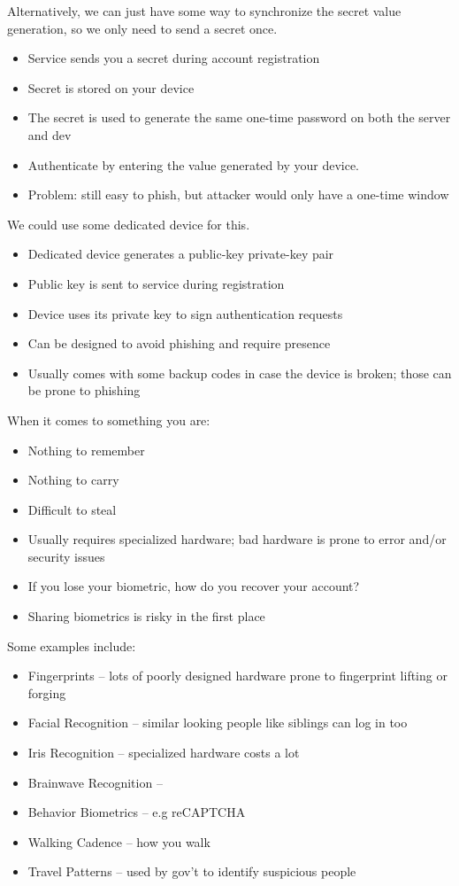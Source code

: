 \documentclass[code]{amznotes}
\begin{document}
Alternatively, we can just have some way to synchronize the secret value generation, so we only need to send a secret once.
\begin{itemize}[noitemsep]
    \item Service sends you a secret during account registration
    \item Secret is stored on your device
    \item The secret is used to generate the same one-time password on both the server and dev
    \item Authenticate by entering the value generated by your device.
    \item Problem: still easy to phish, but attacker would only have a one-time window
\end{itemize}

We could use some dedicated device for this.
\begin{itemize}[noitemsep]
    \item Dedicated device generates a public-key private-key pair
    \item Public key is sent to service during registration
    \item Device uses its private key to sign authentication requests
    \item Can be designed to avoid phishing and require presence
    \item Usually comes with some backup codes in case the device is broken; those can be prone to phishing
\end{itemize}

When it comes to something you are:
\begin{itemize}[noitemsep]
    \item Nothing to remember
    \item Nothing to carry
    \item Difficult to steal
    \item Usually requires specialized hardware; bad hardware is prone to error and/or security issues
    \item If you lose your biometric, how do you recover your account?
    \item Sharing biometrics is risky in the first place
\end{itemize}

Some examples include:
\begin{itemize}[noitemsep]
    \item Fingerprints -- lots of poorly designed hardware prone to fingerprint lifting or forging
    \item Facial Recognition -- similar looking people like siblings can log in too
    \item Iris Recognition -- specialized hardware costs a lot
    \item Brainwave Recognition --
    \item Behavior Biometrics -- e.g reCAPTCHA
    \item Walking Cadence -- how you walk
    \item Travel Patterns -- used by gov't to identify suspicious people
\end{itemize}
\end{document}
